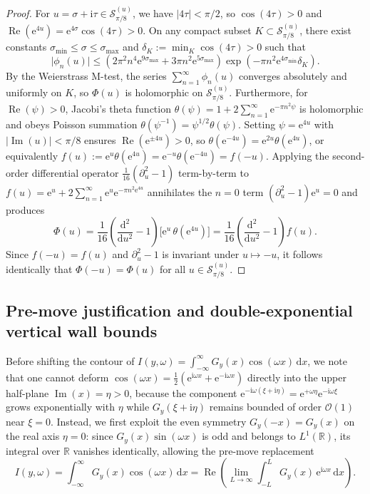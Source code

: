 \documentclass[11pt,a4paper,reqno]{amsart}
\theoremstyle{definition}
\theoremstyle{remark}
\numberwithin{equation}{section}
\newcommand{\dd}{\mathrm{d}}
\newcommand{\ii}{\mathrm{i}}
\newcommand{\ee}{\mathrm{e}}
\newcommand{\Rea}{\operatorname{Re}}
\newcommand{\Ima}{\operatorname{Im}}
\begin{document}
\begin{proof}
For $u = \sigma + \ii\tau \in \mathcal{S}_{\pi/8}^{(u)}$, we have $|4\tau| < \pi/2$, so $\cos(4\tau) > 0$ and $\Rea(\ee^{4u}) = \ee^{4\sigma}\cos(4\tau) > 0$. On any compact subset $K \subset \mathcal{S}_{\pi/8}^{(u)}$, there exist constants $\sigma_{\min} \le \sigma \le \sigma_{\max}$ and $\delta_K := \min_{K} \cos(4\tau) > 0$ such that
\[
\big|\phi_n(u)\big| \le \left(2\pi^2 n^4 \ee^{9\sigma_{\max}} + 3\pi n^2 \ee^{5\sigma_{\max}}\right)\exp\!\left(-\pi n^2 \ee^{4\sigma_{\min}}\delta_K\right).
\]
By the Weierstrass M-test, the series $\sum_{n=1}^\infty \phi_n(u)$ converges absolutely and uniformly on $K$, so $\Phi(u)$ is holomorphic on $\mathcal{S}_{\pi/8}^{(u)}$. Furthermore, for $\Rea(\psi) > 0$, Jacobi's theta function $\theta(\psi) = 1 + 2\sum_{n=1}^\infty \ee^{-\pi n^2 \psi}$ is holomorphic and obeys Poisson summation $\theta(\psi^{-1}) = \psi^{1/2}\theta(\psi)$. Setting $\psi = \ee^{4u}$ with $|\Ima(u)| < \pi/8$ ensures $\Rea(\ee^{\pm 4u}) > 0$, so $\theta(\ee^{-4u}) = \ee^{2u}\theta(\ee^{4u})$, or equivalently $f(u) := \ee^u\theta(\ee^{4u}) = \ee^{-u}\theta(\ee^{-4u}) = f(-u)$. Applying the second-order differential operator $\frac{1}{16}(\partial_u^2 - 1)$ term-by-term to $f(u) = \ee^u + 2\sum_{n=1}^\infty \ee^u\ee^{-\pi n^2\ee^{4u}}$ annihilates the $n=0$ term $(\partial_u^2 - 1)\ee^u = 0$ and produces
\begin{equation}\label{eq:jacobi_diff_id}
\Phi(u) = \frac{1}{16}\left(\frac{\dd^2}{\dd u^2} - 1\right)\!\Big[\ee^u\,\theta(\ee^{4u})\Big] = \frac{1}{16}\left(\frac{\dd^2}{\dd u^2} - 1\right)f(u).
\end{equation}
Since $f(-u) = f(u)$ and $\partial_u^2 - 1$ is invariant under $u \mapsto -u$, it follows identically that $\Phi(-u) = \Phi(u)$ for all $u \in \mathcal{S}_{\pi/8}^{(u)}$.
\end{proof}

\subsection{Pre-move justification and double-exponential vertical wall bounds}\label{subsec:pre_move}

Before shifting the contour of $I(y,\omega) = \int_{-\infty}^\infty G_y(x)\cos(\omega x)\,\dd x$, we note that one cannot deform $\cos(\omega x) = \frac{1}{2}(\ee^{\ii\omega x} + \ee^{-\ii\omega x})$ directly into the upper half-plane $\Ima(x) = \eta > 0$, because the component $\ee^{-\ii\omega(\xi+\ii\eta)} = \ee^{+\omega\eta}\ee^{-\ii\omega\xi}$ grows exponentially with $\eta$ while $G_y(\xi+\ii\eta)$ remains bounded of order $\mathcal{O}(1)$ near $\xi = 0$. Instead, we first exploit the even symmetry $G_y(-x) = G_y(x)$ on the real axis $\eta = 0$: since $G_y(x)\sin(\omega x)$ is odd and belongs to $L^1(\mathbb{R})$, its integral over $\mathbb{R}$ vanishes identically, allowing the pre-move replacement
\begin{equation}\label{eq:pre_move}
I(y,\omega) = \int_{-\infty}^\infty G_y(x)\cos(\omega x)\,\dd x = \Rea\!\left(\lim_{L\to\infty}\int_{-L}^L G_y(x)\,\ee^{\ii\omega x}\,\dd x\right).
\end{equation}
\end{document}
